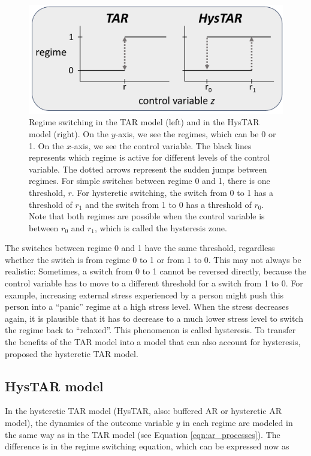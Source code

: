 \documentclass{article}
\begin{document}
\begin{figure}
\centering
\includegraphics[scale=0.4]{simple_vs_hysteretic_2}
\caption{Regime switching in the TAR model (left) and in the HysTAR model (right). On the $y$-axis, we see the regimes, which can be 0 or 1. On the $x$-axis, we see the control variable. 
The black lines represents which regime is active for different levels of the control variable. The dotted arrows represent the sudden jumps between regimes.
For simple switches between regime 0 and 1, there is one threshold, $r$. For hysteretic switching, the switch from 0 to 1 has a threshold of $r_1$ and the switch from 1 to 0 has a threshold of $r_0$. Note that both regimes are possible when the control variable is between $r_0$ and $r_1$, which is called the hysteresis zone.}
\label{fig:simple_vs_hysteretic_2}
\end{figure}

The switches between regime 0 and 1 have the same threshold, regardless whether the switch is from regime 0 to 1 or from 1 to 0. 
This may not always be realistic: Sometimes, a switch from 0 to 1 cannot be reversed directly, because the control variable has to move to a different threshold  for a switch from 1 to 0.
For example, increasing external stress experienced by a person might push this person into a ``panic'' regime at a high stress level.
When the stress decreases again, it is plausible that it has to decrease to a much lower stress level to switch the regime back to ``relaxed''.
This phenomenon is called hysteresis.
To transfer the benefits of the TAR model into a model that can also account for hysteresis, \citet{bar2} proposed the hysteretic TAR model.

\subsection{HysTAR model}
In the hysteretic TAR model (HysTAR, also: buffered AR or hysteretic AR model), the dynamics of the outcome variable $y$ in each regime are modeled in the same way as in the TAR model (see Equation \ref{eqn:ar_processes}). The difference is in the regime switching equation, which can be expressed now as
\end{document}
